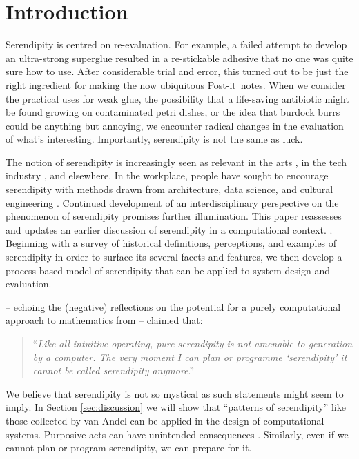 \section{Introduction}

Serendipity is centred on re-evaluation.  For example, a failed
attempt to develop an ultra-strong superglue resulted in a
re-stickable adhesive that no one was quite sure how to use.  After
considerable trial and error, this turned out to be just the right
ingredient for making the now ubiquitous Post-it\texttrademark\ notes.
%
%
When we consider the practical uses for weak glue, the possibility
that a life-saving antibiotic might be found growing on contaminated
petri dishes, or the idea that burdock burrs could be anything but
annoying, we encounter radical changes in the evaluation of what's
interesting.  Importantly, serendipity is not the same as luck. 

The notion of serendipity is increasingly seen as relevant in the arts
\cite{mckay-serendipity}, in the tech industry \cite{rao2015breaking},
and elsewhere.  In the workplace, people have sought to encourage
serendipity with methods drawn from architecture, data science, and
cultural engineering
\cite{kakko2009homo,engineering-serendipity,who-moved-cube}.
Continued development of an interdisciplinary perspective on the
phenomenon of serendipity promises further illumination.  This paper
reassesses and updates an earlier discussion of serendipity in a
computational context.  \cite{pease2013discussion}.  Beginning with a
survey of historical definitions, perceptions, and examples of
serendipity in order to surface its several facets and features, we
then develop a process-based model of serendipity that can be applied
to system design and evaluation.

 -- echoing the
(negative) reflections on the potential
for a purely computational approach to mathematics from  -- claimed that:
\begin{quote}
``\emph{Like all intuitive operating, pure serendipity is not amenable
    to generation by a computer.  The very moment I can plan or
    programme `serendipity' it cannot be called serendipity
    anymore}.'' \cite[p.~646]{van1994anatomy}
\end{quote}
We believe that serendipity is not so mystical as such statements
might seem to imply.  In Section \ref{sec:discussion} we will show
that ``patterns of serendipity'' like those collected by van Andel can
be applied in the design of computational systems.  Purposive acts can
have unintended consequences \cite{merton1936unanticipated}.
Similarly, even if we cannot plan or program serendipity, we can
prepare for it.

